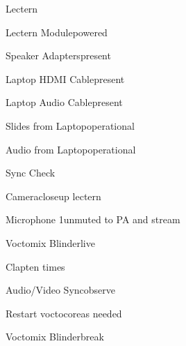 \begin{checklist}{Lectern}
  \item{Lectern Module}{powered}
  \item{Speaker Adapters}{present}
  \item{Laptop HDMI Cable}{present}
  \item{Laptop Audio Cable}{present}
  \item{Slides from Laptop}{operational}
  \item{Audio from Laptop}{operational}
\end{checklist}


\begin{checklist}{Sync Check}
  \item{Camera}{closeup lectern}
  \item{Microphone 1}{unmuted to PA and stream}
  \item{Voctomix Blinder}{live}
  \item{Clap}{ten times}
  \item{Audio/Video Sync}{observe}
  \item{Restart voctocore}{as needed}
  \item{Voctomix Blinder}{break}

\end{checklist}


